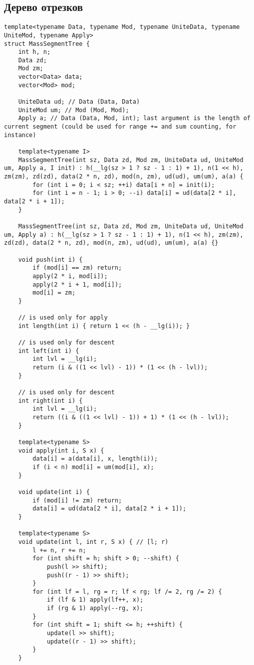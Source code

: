\subsection{Дерево отрезков}
\begin{lstlisting}
template<typename Data, typename Mod, typename UniteData, typename UniteMod, typename Apply>
struct MassSegmentTree {
    int h, n;
    Data zd;
    Mod zm;
    vector<Data> data;
    vector<Mod> mod;

    UniteData ud; // Data (Data, Data)
    UniteMod um; // Mod (Mod, Mod);
    Apply a; // Data (Data, Mod, int); last argument is the length of current segment (could be used for range += and sum counting, for instance)

    template<typename I>
    MassSegmentTree(int sz, Data zd, Mod zm, UniteData ud, UniteMod um, Apply a, I init) : h(__lg(sz > 1 ? sz - 1 : 1) + 1), n(1 << h), zm(zm), zd(zd), data(2 * n, zd), mod(n, zm), ud(ud), um(um), a(a) {
        for (int i = 0; i < sz; ++i) data[i + n] = init(i);
        for (int i = n - 1; i > 0; --i) data[i] = ud(data[2 * i], data[2 * i + 1]);
    }

    MassSegmentTree(int sz, Data zd, Mod zm, UniteData ud, UniteMod um, Apply a) : h(__lg(sz > 1 ? sz - 1 : 1) + 1), n(1 << h), zm(zm), zd(zd), data(2 * n, zd), mod(n, zm), ud(ud), um(um), a(a) {}

    void push(int i) {
        if (mod[i] == zm) return;
        apply(2 * i, mod[i]);
        apply(2 * i + 1, mod[i]);
        mod[i] = zm;
    }

    // is used only for apply
    int length(int i) { return 1 << (h - __lg(i)); }

    // is used only for descent
    int left(int i) {
        int lvl = __lg(i);
        return (i & ((1 << lvl) - 1)) * (1 << (h - lvl));
    }

    // is used only for descent
    int right(int i) {
        int lvl = __lg(i);
        return ((i & ((1 << lvl) - 1)) + 1) * (1 << (h - lvl));
    }

    template<typename S>
    void apply(int i, S x) {
        data[i] = a(data[i], x, length(i));
        if (i < n) mod[i] = um(mod[i], x);
    }

    void update(int i) {
        if (mod[i] != zm) return;
        data[i] = ud(data[2 * i], data[2 * i + 1]);
    }

    template<typename S>
    void update(int l, int r, S x) { // [l; r)
        l += n, r += n;
        for (int shift = h; shift > 0; --shift) {
            push(l >> shift);
            push((r - 1) >> shift);
        }
        for (int lf = l, rg = r; lf < rg; lf /= 2, rg /= 2) {
            if (lf & 1) apply(lf++, x);
            if (rg & 1) apply(--rg, x);
        }
        for (int shift = 1; shift <= h; ++shift) {
            update(l >> shift);
            update((r - 1) >> shift);
        }
    }


\end{lstlisting}
